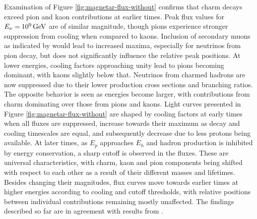 Examination of Figure \ref{fig:magnetar-flux-without} confirms that charm decays exceed pion and kaon contributions at earlier times.
Peak flux values for $E_\nu = \kern-0.5pt \qty{e9}{\giga\electronvolt}$ are of similar magnitude, though pions experience stronger
suppression from cooling when compared to kaons. Inclusion of secondary muons as indicated by \cite{Carpio_2020} would
lead to increased maxima, especially for neutrinos from pion decay, but does not significantly influence the relative peak positions.
At lower energies, cooling factors approaching unity lead to pions becoming dominant, with kaons slightly below that. Neutrinos
from charmed hadrons are now suppressed due to their lower production cross sections and branching ratios. The opposite behavior
is seen as energies become larger, with contributions from charm dominating over those from pions and kaons. Light curves presented
in Figure \ref{fig:magnetar-flux-without} are shaped by cooling factors at early times when all fluxes are suppressed, increase towards
their maximum as decay and cooling timescales are equal, and subsequently decrease due to less protons being available. At later times,
as $E_p$ approaches $E_h$ and hadron production is inhibited by energy conservation, a sharp cutoff is observed in the fluxes. These
are universal characteristics, with charm, kaon and pion components being shifted with respect to each other as a result of their
different masses and lifetimes. Besides changing their magnitudes, flux curves move towards earlier times at higher energies
according to cooling and cutoff thresholds, with relative positions between individual contributions remaining mostly unaffected. 
The findings described so far are in agreement with results from \cite{Carpio_2020}.

\newpage

